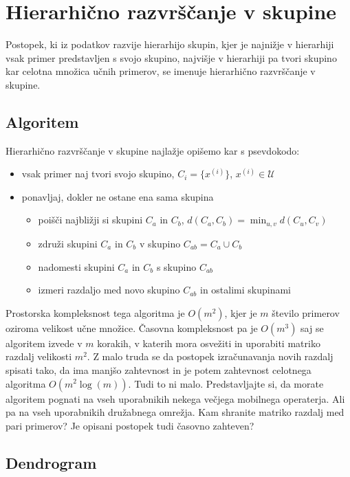 \section{Hierarhično razvrščanje v skupine}

Postopek, ki iz podatkov razvije hierarhijo skupin, kjer je najnižje v
hierarhiji vsak primer predstavljen s svojo skupino, najvišje v
hierarhiji pa tvori skupino kar celotna množica učnih primerov, se
imenuje hierarhično razvrščanje v skupine.

\subsection{Algoritem}

Hierarhično razvrščanje v skupine najlažje opišemo kar s psevdokodo:
\begin{itemize}
\item vsak primer naj tvori svojo skupino, $C_i=\{x^{(i)}\}$,
  $x^{(i)}\in\mathcal{U}$
\item ponavljaj, dokler ne ostane ena sama skupina
\begin{itemize}
\item poišči najbližji si skupini $C_a$ in $C_b$,
  $d(C_a,C_b)=\min_{u,v}d(C_u,C_v)$
\item združi skupini $C_a$ in $C_b$ v skupino $C_{ab}=C_a\cup
  C_b$
\item nadomesti skupini $C_a$ in $C_b$ s skupino $C_{ab}$
\item izmeri razdaljo med novo skupino $C_{ab}$ in ostalimi skupinami
\end{itemize}
\end{itemize}

Prostorska kompleksnost tega algoritma je $O(m^2)$, kjer je $m$
število primerov oziroma velikost učne množice. Časovna kompleksnost
pa je $O(m^3)$ saj se algoritem izvede v $m$ korakih, v katerih mora
osvežiti in uporabiti matriko razdalj velikosti $m^2$. Z malo truda se
da postopek izračunavanja novih razdalj spisati tako, da ima manjšo
zahtevnost in je potem zahtevnost celotnega algoritma
$O(m^2\log(m))$. Tudi to ni malo. Predstavljajte si, da morate
algoritem pognati na vseh uporabnikih nekega večjega mobilnega
operaterja. Ali pa na vseh uporabnikih družabnega omrežja. Kam
shranite matriko razdalj med pari primerov? Je opisani postopek tudi
časovno zahteven?

\subsection{Dendrogram}

